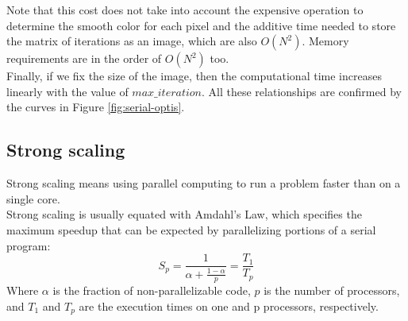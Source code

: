 \documentclass[11pt,a4paper]{article}
\begin{document}
Note that this cost does not take into account the expensive operation to determine the smooth color for each pixel and the additive time needed to store the matrix of iterations as an image, which are also $O(N^2)$.
Memory requirements are in the order of $O(N^2)$ too.\\[-7pt]

Finally, if we fix the size of the image, then the computational time increases linearly with the value of $max\_iteration$.
All these relationships are confirmed by the curves in Figure \ref{fig:serial-optis}.

\vspace{-0.1cm}
\subsection{Strong scaling}
Strong scaling means using parallel computing to run a problem faster than on a single core.\\
Strong scaling is usually equated with Amdahl's Law, which specifies the maximum speedup that can be expected by parallelizing portions of a serial program:
\vspace{-0.1cm}
$$S_p = \frac{1}{\alpha + \frac{1 - \alpha}{p}} = \frac{T_1}{T_p}$$
Where $\alpha$ is the fraction of non-parallelizable code, $p$ is the number of processors, and $T_1$ and $T_p$ are the execution times on one and p processors, respectively.\\[-7pt]
\end{document}

